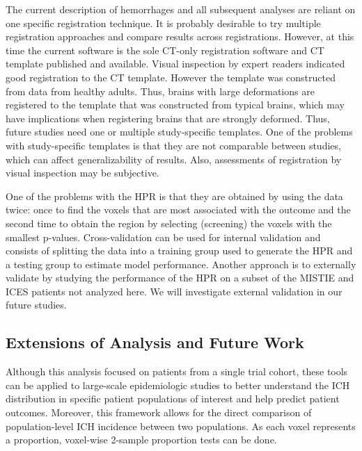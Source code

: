 \documentclass[10pt]{article}\usepackage[]{graphicx}\usepackage[]{color}
\begin{document}
The current description of hemorrhages and all subsequent analyses are reliant on one specific registration technique.  It is probably desirable \cite{eloyan_ms} to try multiple registration approaches and compare results across registrations.
However, at this time the current software is the sole CT-only registration software and CT template published and available.  Visual inspection by expert readers indicated good registration to the CT template. However the template was constructed from data from healthy adults.  Thus, brains with large deformations are registered to the template that was constructed from typical brains, which may have implications when registering brains that are strongly deformed.  Thus, future studies need one or multiple study-specific templates.  One of the problems with study-specific templates is that they are not comparable between studies, which can affect generalizability of results.
Also, assessments of registration by visual inspection may be subjective.

One of the problems with the HPR is that they are obtained by using the data twice: once to find the voxels that are most associated with the outcome and the second time to obtain the region by selecting (screening) the voxels with the smallest p-values. Cross-validation can be used for internal validation and consists of splitting the data into a training group used to generate the HPR and a testing group to estimate model performance.  Another approach is to externally validate by studying the performance of the HPR on a subset of the MISTIE and ICES patients not analyzed here. We will investigate external validation in our future studies.  

\subsection{Extensions of Analysis and Future Work }
Although this analysis focused on patients from a single trial cohort, these tools can be applied to large-scale epidemiologic studies to better understand the ICH distribution in specific patient populations of interest and help predict patient outcomes.  Moreover, this framework allows for the direct comparison of population-level ICH incidence between two populations.  As each voxel represents a proportion, voxel-wise 2-sample proportion tests can be done.
\end{document}
